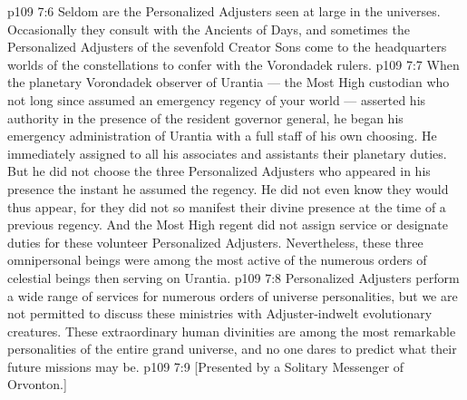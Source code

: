 \vs p109 7:6 Seldom are the Personalized Adjusters seen at large in the universes. Occasionally they consult with the Ancients of Days, and sometimes the Personalized Adjusters of the sevenfold Creator Sons come to the headquarters worlds of the constellations to confer with the Vorondadek rulers.
\vs p109 7:7 \pc When the planetary Vorondadek observer of Urantia --- the Most High custodian who not long since assumed an emergency regency of your world --- asserted his authority in the presence of the resident governor general, he began his emergency administration of Urantia with a full staff of his own choosing. He immediately assigned to all his associates and assistants their planetary duties. But he did not choose the three Personalized Adjusters who appeared in his presence the instant he assumed the regency. He did not even know they would thus appear, for they did not so manifest their divine presence at the time of a previous regency. And the Most High regent did not assign service or designate duties for these volunteer Personalized Adjusters. Nevertheless, these three omnipersonal beings were among the most active of the numerous orders of celestial beings then serving on Urantia.
\vs p109 7:8 \pc Personalized Adjusters perform a wide range of services for numerous orders of universe personalities, but we are not permitted to discuss these ministries with Adjuster\hyp{}indwelt evolutionary creatures. These extraordinary human divinities are among the most remarkable personalities of the entire grand universe, and no one dares to predict what their future missions may be.
\vsetoff
\vs p109 7:9 [Presented by a Solitary Messenger of Orvonton.]
